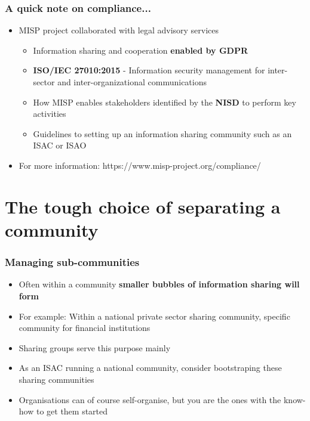 \begin{frame}
\frametitle{A quick note on compliance...}
\begin{itemize}
	\item MISP project collaborated with legal advisory services
	\begin{itemize}
		\item Information sharing and cooperation \textbf{enabled by GDPR}
        \item \textbf{ISO/IEC 27010:2015} - Information security management for inter-sector and inter-organizational communications
		\item How MISP enables stakeholders identified by the \textbf{NISD} to perform key activities
        \item Guidelines to setting up an information sharing community such as an ISAC or ISAO
	\end{itemize}
	\item For more information: https://www.misp-project.org/compliance/
\end{itemize}
\end{frame}

\section{The tough choice of separating a community}

\begin{frame}
	\frametitle{Managing sub-communities}
	\begin{itemize}
		\item Often within a community \textbf{smaller bubbles of information sharing will form}
		\item For example: Within a national private sector sharing community, specific community for financial institutions
		\item Sharing groups serve this purpose mainly
		\item As an ISAC running a national community, consider bootstraping these sharing communities
		\item Organisations can of course self-organise, but you are the ones with the know-how to get them started
	\end{itemize}
\end{frame}

